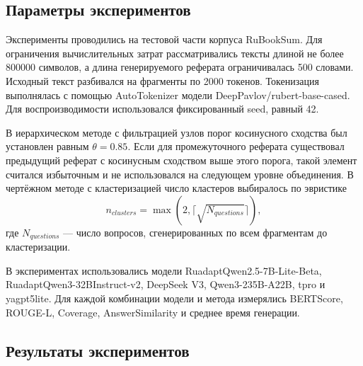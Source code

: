 \documentclass[oneside,senior,etd]{BYUPhys}
\begin{document}
\subsection{Параметры экспериментов}

Эксперименты проводились на тестовой части корпуса RuBookSum. Для ограничения вычислительных затрат рассматривались тексты длиной не более 800000 символов, а длина генерируемого реферата ограничивалась 500 словами. Исходный текст разбивался на фрагменты по 2000 токенов. Токенизация выполнялась с помощью AutoTokenizer модели DeepPavlov/rubert-base-cased. Для воспроизводимости использовался фиксированный seed, равный 42.

В иерархическом методе с фильтрацией узлов порог косинусного сходства был установлен равным $\theta = 0.85$. Если для промежуточного реферата существовал предыдущий реферат с косинусным сходством выше этого порога, такой элемент считался избыточным и не использовался на следующем уровне объединения. В чертёжном методе с кластеризацией число кластеров выбиралось по эвристике
\[
n_{clusters} = \max(2, \lceil \sqrt{N_{questions}} \rceil),
\]
где $N_{questions}$ --- число вопросов, сгенерированных по всем фрагментам до кластеризации.

В экспериментах использовались модели RuadaptQwen2.5-7B-Lite-Beta, RuadaptQwen3-32BInstruct-v2, DeepSeek V3, Qwen3-235B-A22B, tpro и yagpt5lite. Для каждой комбинации модели и метода измерялись BERTScore, ROUGE-L, Coverage, AnswerSimilarity и среднее время генерации.

\subsection{Результаты экспериментов}
\end{document}
